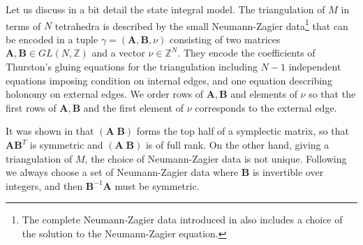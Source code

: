 \documentclass[a4paper,11pt]{article}	%
\def\IZ{\mathbb{Z}}
\begin{document}
Let us discuss in a bit detail the state integral model.  The
triangulation of $M$ in terms of $N$ tetrahedra is described by the
small Neumann-Zagier data\footnote{The complete Neumann-Zagier data
  introduced in \cite{Dimofte:2015kkp,Dimofte:2012qj} also includes a
  choice of the solution to the Neumann-Zagier equation.} that can be
encoded in a tuple $\gamma = (\pmb{A},\pmb{B},\nu)$ consisting
of %
two matrices $\pmb{A},\pmb{B}\in GL(N,\IZ)$ and a vector $\nu
\in\IZ^N$. They encode the coefficients of Thurston's gluing equations
for the triangulation including $N-1$ independent equations imposing
condition on internal edges, and one equation describing holonomy on
external edges.  We order rows of $\pmb{A},\pmb{B}$ and elements of
$\nu$ so that the first rows of $\pmb{A},\pmb{B}$ and the first element
of $\nu$ corresponds to the external edge.


It was shown in \cite{Neumann:1985vht} that $(\pmb{A}\;\pmb{B})$ forms
the top half of a symplectic matrix, so that $\pmb{A}\pmb{B}^T$ is
symmetric and $(\pmb{A}\;\pmb{B})$ is of full rank.  On the other hand,
giving a triangulation of $M$, the choice of Neumann-Zagier data is
not unique.  Following \cite{Dimofte:2015kkp,Dimofte:2012qj} we always
choose a set of Neumann-Zagier data where $\pmb{B}$ is invertible over
integers, and then $\pmb{B}^{-1}\pmb{A}$ must be symmetric.
\end{document}
